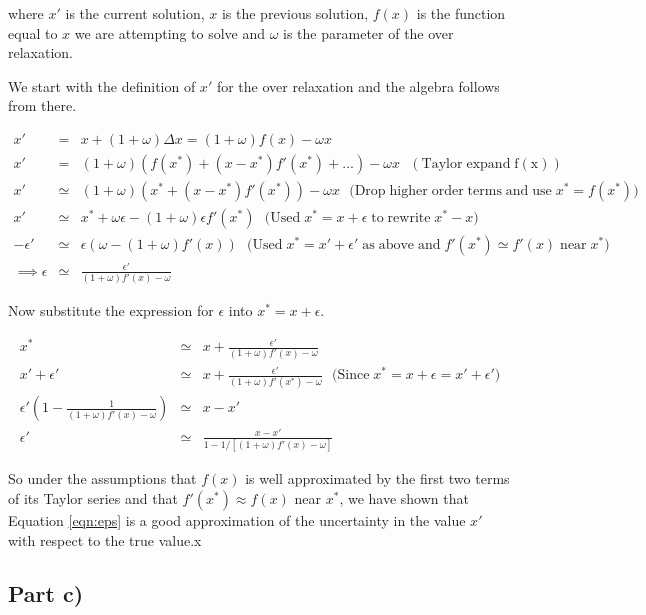 \documentclass[a4paper,12pt]{article}
\begin{document}
where $x'$ is the current solution, $x$ is the previous solution, $f(x)$ is the function equal to $x$ we are attempting to solve and $\omega$ is the parameter of the over relaxation.

We start with the definition of $x'$ for the over relaxation and the algebra follows from there.

\begin{eqnarray}
x' &=& x + (1+\omega)\Delta x = (1+\omega)f(x) - \omega x\nonumber\\
x' &=& (1+\omega)(f(x^*) + (x-x^*)f'(x^*) + ...) - \omega x \mathrm{\:\:\:(Taylor\;expand\;f(x))}\nonumber\\
x' &\simeq & (1+\omega)(x^* + (x-x^*)f'(x^*)) - \omega x \mathrm{\:\:\:(Drop\; higher\;order\;terms\;and\;use\;}x^* = f(x^*)\mathrm{)}\nonumber\\
x' &\simeq & x^* + \omega \epsilon - (1+\omega)\epsilon f'(x^*) \mathrm{\:\:\:(Used\;} x^* = x + \epsilon\mathrm{\;to\; rewrite\;} x^*-x)\nonumber\\
-\epsilon' &\simeq& \epsilon (\omega - (1+\omega)f'(x))\mathrm{\:\:\:(Used\;} x^* = x' + \epsilon' \mathrm{\; as\; above\; and\;} f'(x^*)\simeq f'(x)\mathrm{\; near\;} x^*)\nonumber\\
\implies \epsilon &\simeq& \frac{\epsilon'}{(1+\omega)f'(x) - \omega}\nonumber
\end{eqnarray}

Now substitute the expression for $\epsilon$ into $x^* = x + \epsilon$.

\begin{eqnarray}
x^* &\simeq& x + \frac{\epsilon'}{(1+\omega)f'(x) - \omega}\nonumber\\
x' + \epsilon' &\simeq& x + \frac{\epsilon'}{(1+\omega)f'(x^*)-\omega} \mathrm{\:\:\:(Since\;} x^* = x + \epsilon = x' + \epsilon')\nonumber\\
\epsilon'\left(1 - \frac{1}{(1+\omega)f'(x) - \omega}\right) &\simeq& x - x'\nonumber\\
\epsilon' &\simeq& \frac{x-x'}{1-1/[(1+\omega)f'(x) - \omega]}\nonumber 
\end{eqnarray}

So under the assumptions that $f(x)$ is well approximated by the first two terms of its Taylor series and that $f'(x^*)\approx f(x)$ near $x^*$, we have shown that Equation \ref{eqn:eps} is a good approximation of the uncertainty in the value $x'$ with respect to the true value.x

\subsection{Part c)}
\end{document}
